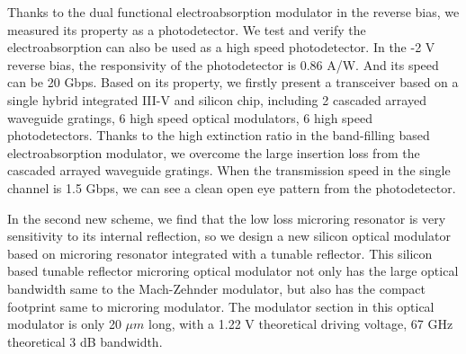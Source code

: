 \begin{englishabstract}
Thanks to the dual functional  electroabsorption modulator in the reverse bias, we measured its property as a photodetector. We test and verify the electroabsorption can also be used as a high speed photodetector. In the -2 V reverse bias, the responsivity of the photodetector is 0.86 A/W. And its speed can be 20 Gbps. Based on its property, we firstly present a transceiver based on a single hybrid integrated III-V and silicon chip, including 2 cascaded arrayed waveguide gratings, 6 high speed optical modulators, 6 high speed photodetectors. Thanks to the high extinction ratio in the band-filling based electroabsorption modulator, we overcome the large insertion loss from the cascaded arrayed waveguide gratings. When the transmission speed in the single channel is 1.5 Gbps, we can see a clean open eye pattern from the photodetector.

In the second new scheme, we find that the low loss microring resonator is very sensitivity to its internal reflection, so we design a new silicon optical modulator based on microring resonator integrated with a tunable reflector. This silicon based tunable reflector microring optical modulator not only has the large optical bandwidth same to the Mach-Zehnder modulator, but also has the compact footprint same to microring modulator. The modulator section in this optical modulator is only 20 $\mu m$ long, with a 1.22 V theoretical driving voltage, 67 GHz theoretical 3 dB bandwidth.


\end{englishabstract}
